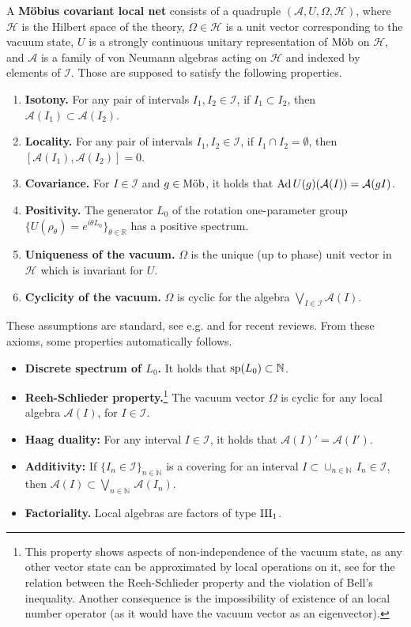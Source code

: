 \documentclass[a4paper,12pt]{article}
\theoremstyle{plain}
\theoremstyle{definition}
\theoremstyle{remark}
\newcommand{\Mob}{{\rm M\ddot{o}b}}
\def\RR{{\mathbb R}}
\def\A{{\mathcal A}}
\def\H{{\mathcal H}}
\def\Ad{{\hbox{\rm Ad\,}}}
\begin{document}
A {\bf M\"obius covariant local net} consists of a quadruple $(\A,U,\Omega,\H)$,
where $\H$ is the Hilbert space of the theory, $\Omega\in\H$ is a unit vector corresponding to the vacuum state,
$U$ is a strongly continuous unitary representation of $\Mob$ on $\H$, and $\A$
is a family of von Neumann algebras acting on $\H$ and indexed by elements of $\mathcal{I}$.
Those are supposed to satisfy the following properties.
  \begin{enumerate}
  \item {\bf Isotony.} For any pair of intervals $I_1, I_2 \in \mathcal{I}$, if $I_1 \subset I_2$, then $\A(I_1) \subset \A(I_2)$.
  \item {\bf Locality.} For any pair of intervals $I_1, I_2 \in \mathcal{I}$, if $I_1 \cap I_2 = \emptyset$,
  then $[\A(I_1),\A(I_2)]=0$.
  \item {\bf Covariance.} For $I\in\mathcal{I}$ and $g \in \Mob$,
  it holds that $\Ad U(g)(\A(I)) = \A(gI)$.
  \item {\bf Positivity.} The generator $L_0$ of the rotation one-parameter group $\{U(\rho_\theta) = e^{i\theta L_0}\}_{\theta\in\RR}$ has a positive spectrum.
  \item {\bf Uniqueness of the vacuum.} $\Omega$ is the unique (up to phase) unit vector in $\H$
  which is invariant for $U$.
  \item {\bf Cyclicity of the vacuum.} $\Omega$ is cyclic for the algebra
  $\bigvee_{I\in\mathcal{I}}\A(I)$.
  \end{enumerate}
These assumptions are standard, see e.g.\! \cite{gabfro93, frejor96}
and \cite{Rehren15, kawahigashi15} for recent reviews.
From these axioms, some properties automatically follows.
\begin{itemize}
\item {\bf Discrete spectrum of $L_0$.} It holds that ${\rm sp}(L_0) \subset \mathbb{N}$.

\item {\bf Reeh-Schlieder property.}\footnote{This property shows aspects of non-independence of the vacuum state,
as any other vector state can be approximated by local operations on it, see \cite{SW85, SW87}
for the relation between the Reeh-Schlieder property and the violation of Bell's inequality.
Another consequence is the impossibility of existence of an local number operator (as it would have the vacuum vector as an eigenvector).}
The vacuum vector $\Omega$ is cyclic for any local algebra $\A(I)$, for $I\in\mathcal{I}$.

\item {\bf Haag duality:} For any interval $I\in\mathcal{I}$, it holds that $\A(I)' = \A(I')$.

\item {\bf Additivity:} If $\{I_n\in \mathcal{I}\}_{n\in\mathbb{N}}$ is a covering for an interval
$I \subset \cup_{n\in\mathbb{N}} \, I_n \in \mathcal{I}$, then $\A(I) \subset \bigvee_{n\in\mathbb{N}}\,\A(I_n)$.
  
\item {\bf Factoriality.} Local algebras are factors of type ${\rm III}_1$.
  
\end{itemize}
\end{document}
